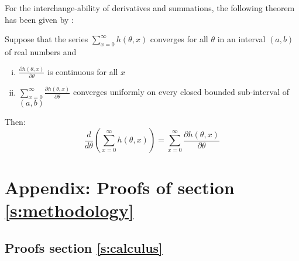For the interchange-ability of derivatives and summations, the following theorem has been given by \cite{casella2002}:
\begin{theorem}
    Suppose that the series \(\sum_{x = 0}^{\infty} h(\theta, x)\) converges for all \(\theta\) in an interval \((a, b)\) of real numbers and 
    
    \begin{enumerate}[(i)]
        \item \(\frac{\partial h(\theta, x)}{\partial \theta}\) is continuous for all \(x\)
        \item \(\sum_{x = 0}^{\infty} \frac{\partial h(\theta, x)}{\partial \theta}\) converges uniformly on every closed bounded sub-interval of \((a, b)\)
    \end{enumerate}
    Then:
    \[
    \frac{d}{d \theta} \left( \sum_{x = 0}^{\infty} h(\theta, x) \right) = \sum_{x = 0}^{\infty} \frac{\partial h(\theta, x)}{\partial \theta}
    \]
    
   
\end{theorem}


\clearpage
\section{Appendix: Proofs of section \ref{s:methodology}}\label{s:app_B}

\subsection{Proofs section \ref{s:calculus}}

